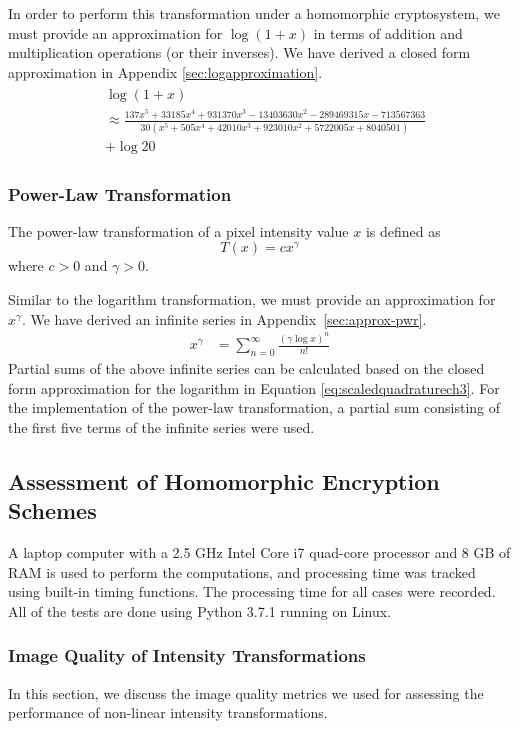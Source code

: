 In order to perform this transformation under a homomorphic cryptosystem, we must provide an approximation for $\log\left(1 + x\right)$ in terms of addition and multiplication operations (or their inverses). We have derived a closed form approximation in Appendix \ref{sec:logapproximation}.
\begin{align}
	\label{eq:scaledquadraturech3}
  \begin{split}
    &\log(1+x) \\
    &\approx \frac{137x^5 + 33185x^4 + 931370x^3 - 13403630x^2 - 289469315x - 713567363}
	{30(x^5 + 505x^4 + 42010x^3 + 923010x^2 + 5722005x + 8040501)} \\
	&+ \log{20}
  \end{split}
\end{align}

\subsubsection{Power-Law Transformation}
The power-law transformation of a pixel intensity value $x$ is defined as
\begin{equation}
    T\left(x\right) = cx^{\gamma}
\end{equation}
where $c>0$ and $\gamma > 0$.

Similar to the logarithm transformation, we must provide an approximation for $x^\gamma$.
We have derived an infinite series in Appendix~\ref{sec:approx-pwr}.
\begin{align}
	x^\gamma &= \sum_{n=0}^{\infty}{\frac{(\gamma\log{x})^n}{n!}}
\end{align}
Partial sums of the above infinite series can be calculated based on the closed form approximation for the logarithm in Equation \ref{eq:scaledquadraturech3}. For the implementation of the power-law transformation, a partial sum consisting of the first five terms of the infinite series were used.

\subsection{Assessment of Homomorphic Encryption Schemes}
A laptop computer with a 2.5 GHz Intel Core i7 quad-core processor and 8 GB of RAM is used to perform the computations, and processing time was tracked using built-in timing functions. The processing time for all cases were recorded. All of the tests are done using Python 3.7.1 running on Linux.

\subsubsection{Image Quality of Intensity Transformations}
In this section, we discuss the image quality metrics we used for assessing the performance of non-linear intensity transformations.

